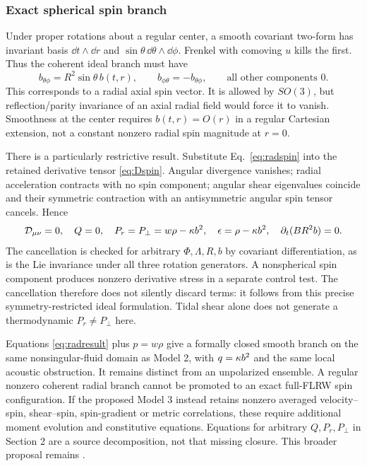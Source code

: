 \subsubsection{Exact spherical spin branch}
Under proper rotations about a regular center, a smooth covariant two-form has invariant basis $\dd t\wedge\dd r$ and $\sin\theta\,\dd\theta\wedge\dd\phi$. Frenkel with comoving $u$ kills the first. Thus the coherent ideal branch must have
\begin{equation}\label{eq:radspin}
 b_{\theta\phi}=R^2\sin\theta\,b(t,r),\qquad b_{\phi\theta}=-b_{\theta\phi},\qquad\text{all other components }0.
\end{equation}
This corresponds to a radial axial spin vector. It is allowed by $SO(3)$, but reflection/parity invariance of an axial radial field would force it to vanish. Smoothness at the center requires $b(t,r)=O(r)$ in a regular Cartesian extension, not a constant nonzero radial spin magnitude at $r=0$.

There is a particularly restrictive result. Substitute Eq.~\eqref{eq:radspin} into the retained derivative tensor \eqref{eq:Dspin}. Angular divergence vanishes; radial acceleration contracts with no spin component; angular shear eigenvalues coincide and their symmetric contraction with an antisymmetric angular spin tensor cancels. Hence
\begin{equation}\label{eq:radresult}
 \mathcal D_{\mu\nu}=0,\quad Q=0,\quad P_r=P_\perp=w\rho-\kappa b^2,\quad\epsilon=\rho-\kappa b^2,
 \quad\partial_t(BR^2b)=0.
\end{equation}
The cancellation is checked for arbitrary $\Phi,\Lambda,R,b$ by covariant differentiation, as is the Lie invariance under all three rotation generators. A nonspherical spin component produces nonzero derivative stress in a separate control test. The cancellation therefore does not silently discard terms: it follows from this precise symmetry-restricted ideal formulation. Tidal shear alone does not generate a thermodynamic $P_r\ne P_\perp$ here.

Equations \eqref{eq:radresult} plus $p=w\rho$ give a formally closed smooth branch on the same nonsingular-fluid domain as Model 2, with $q=\kappa b^2$ and the same local acoustic obstruction. It remains distinct from an unpolarized ensemble. A regular nonzero coherent radial branch cannot be promoted to an exact full-FLRW spin configuration. If the proposed Model 3 instead retains nonzero averaged velocity--spin, shear--spin, spin-gradient or metric correlations, these require additional moment evolution and constitutive equations. Equations for arbitrary $Q,P_r,P_\perp$ in Section 2 are a source decomposition, not that missing closure. This broader proposal remains .
